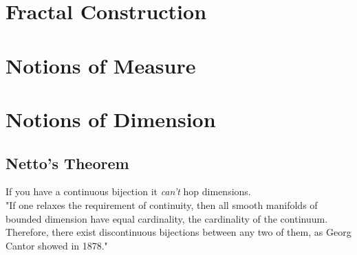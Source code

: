 \documentclass[12pt]{extarticle}
\begin{document}
	\section{Fractal Construction}
	\section{Notions of Measure}
    \section{Notions of Dimension}
	\subsection{Netto's Theorem}
	If you have a continuous bijection it \textit{can't} hop dimensions.
	\\[0.2in]
	"If one relaxes the requirement of continuity, then all smooth manifolds of bounded dimension have equal cardinality, the cardinality of the continuum. Therefore, there exist discontinuous bijections between any two of them, as Georg Cantor showed in 1878."
\end{document}
